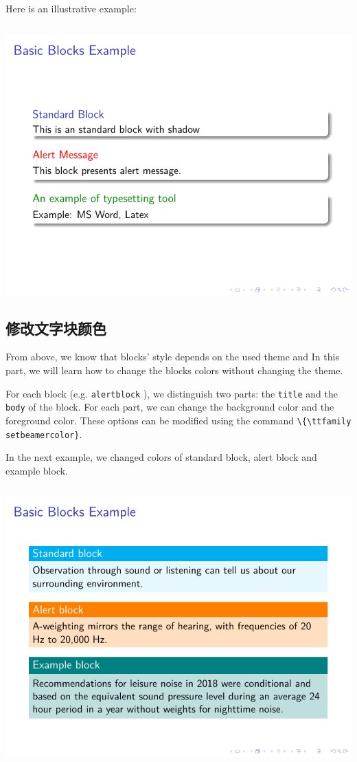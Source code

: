 Here is an illustrative example:

\inputminted[linenos=true]{latex}{examples/beamer/beamerblock05.tex}

\includegraphics{examples/beamer/beamerblock05.pdf}

\subsection{修改文字块颜色}

From above, we know that blocks’ style depends on the used theme and In this part, we will learn how to change the blocks colors without changing the theme.

For each block (e.g. \verb|alertblock| ), we distinguish two parts: the \verb|title| and the \verb|body| of the block. For each part, we can change the background color and the foreground color. These options can be modified using the command \verb|\{\ttfamily setbeamercolor}|.

In the next example, we changed colors of standard block, alert block and example block. 

\inputminted[linenos=true]{latex}{examples/beamer/beamerblock06.tex}

\includegraphics{examples/beamer/beamerblock06.pdf}

